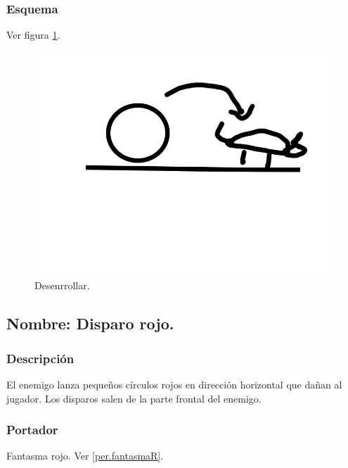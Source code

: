 \documentclass[11pt,letterpaper]{article}
\begin{document}
		\subsubsection{Esquema}
		Ver figura \ref{fig:desenrrollar}.
		\begin{figure}
			\centering
			\includegraphics[height=0.2 \textheight]{Imagenes/desenrrollar}
			\caption{Desenrrollar.}
			\label{fig:desenrrollar}
		\end{figure}
	\subsection{Nombre: Disparo rojo.} \label{hab.disparoR}
		\subsubsection{Descripción}
		El enemigo lanza pequeños círculos rojos en dirección horizontal que dañan al jugador. Los disparos salen de la parte frontal del enemigo.
		\subsubsection{Portador}
		Fantasma rojo. Ver \ref{per.fantasmaR}.
\end{document}
